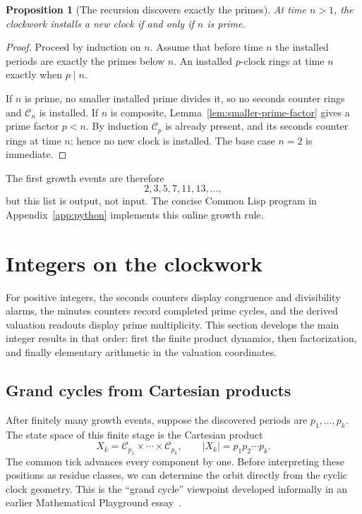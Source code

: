 \documentclass[11pt,a4paper]{article}
\theoremstyle{clockplain}
\newtheorem{proposition}{Proposition}
\theoremstyle{definition}
\theoremstyle{remark}
\begin{document}
\begin{proposition}[The recursion discovers exactly the primes]
\label{prop:prime-discovery}
At time $n>1$, the clockwork installs a new clock if and only if $n$ is prime.
\end{proposition}

\begin{proof}
Proceed by induction on $n$. Assume that before time $n$ the installed periods are exactly the primes below $n$. An installed $p$-clock rings at time $n$ exactly when $p\mid n$.

If $n$ is prime, no smaller installed prime divides it, so no seconds counter rings and $\mathcal C_n$ is installed. If $n$ is composite, Lemma~\ref{lem:smaller-prime-factor} gives a prime factor $p<n$. By induction $\mathcal C_p$ is already present, and its seconds counter rings at time $n$; hence no new clock is installed. The base case $n=2$ is immediate.
\end{proof}

The first growth events are therefore
\[
2,3,5,7,11,13,\ldots,
\]
but this list is output, not input. The concise Common Lisp program in Appendix~\ref{app:python} implements this online growth rule.

\section{Integers on the clockwork}

For positive integers, the seconds counters display congruence and divisibility alarms, the minutes counters record completed prime cycles, and the derived valuation readouts display prime multiplicity. This section develops the main integer results in that order: first the finite product dynamics, then factorization, and finally elementary arithmetic in the valuation coordinates.

\subsection{Grand cycles from Cartesian products}
\label{sec:grand-cycles}

After finitely many growth events, suppose the discovered periods are $p_1,\ldots,p_k$.  The state space of this finite stage is the Cartesian product
\begin{equation}
X_k=\mathcal C_{p_1}\times\cdots\times\mathcal C_{p_k},
\qquad
|X_k|=p_1p_2\cdots p_k.
\label{eq:cartesian-state-space}
\end{equation}
The common tick advances every component by one.  Before interpreting these positions as residue classes, we can determine the orbit directly from the cyclic clock geometry.  This is the ``grand cycle'' viewpoint developed informally in an earlier Mathematical Playground essay~\cite{EmmerichGrandCycles2024}.
\end{document}
